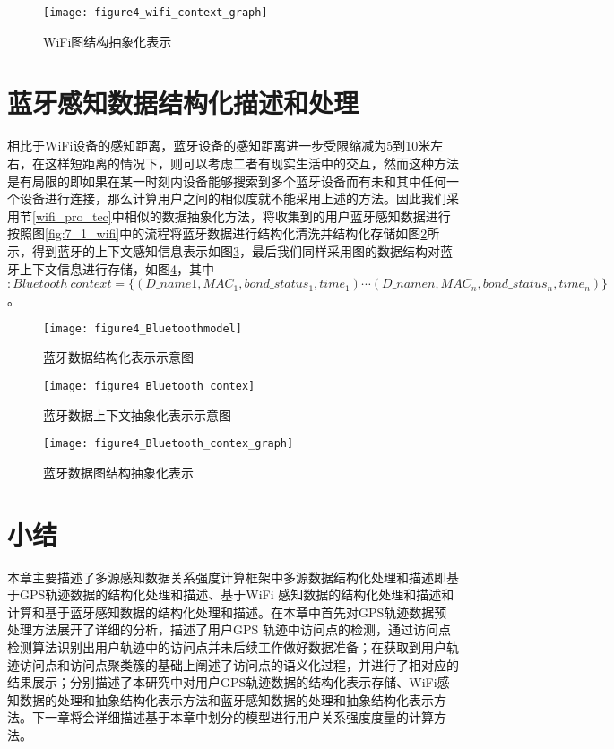 \begin{figure}[htp]
\centering
\texttt{[image: figure4\_wifi\_context\_graph]}
\caption{WiFi图结构抽象化表示}
\label{fig:wifi_context_graph}
\end{figure}
\section{蓝牙感知数据结构化描述和处理}
相比于WiFi设备的感知距离，蓝牙设备的感知距离进一步受限缩减为5到10米左右，在这样短距离的情况下，则可以考虑二者有现实生活中的交互，然而这种方法是有局限的即如果在某一时刻内设备能够搜索到多个蓝牙设备而有未和其中任何一个设备进行连接，那么计算用户之间的相似度就不能采用上述的方法。因此我们采用节\ref{wifi_pro_tec}中相似的数据抽象化方法，将收集到的用户蓝牙感知数据进行按照图\ref{fig:7_1_wifi}中的流程将蓝牙数据进行结构化清洗并结构化存储如图\ref{fig:Bluetoothmodel}所示，得到蓝牙的上下文感知信息表示如图\ref{fig:bluetooth_context}，最后我们同样采用图的数据结构对蓝牙上下文信息进行存储，如图\ref{fig:bluetooth_context_graph}，其中$:Bluetooth \ context= \{ (D\_name{1},MAC_{1},bond\_status_{1},time_{1}) \cdots  (D\_name{n},MAC_{n},bond\_status_{n},time_{n}) \}$。
\begin{figure}[htp]
\centering
\texttt{[image: figure4\_Bluetoothmodel]}
\caption{蓝牙数据结构化表示示意图}
\label{fig:Bluetoothmodel}
\end{figure}

\begin{figure}[htp]
\centering
\texttt{[image: figure4\_Bluetooth\_contex]}
\caption{蓝牙数据上下文抽象化表示示意图}
\label{fig:bluetooth_context}
\end{figure}

\begin{figure}[htb]
\centering
\texttt{[image: figure4\_Bluetooth\_contex\_graph]}
\caption{蓝牙数据图结构抽象化表示}
\label{fig:bluetooth_context_graph}
\end{figure}
\newpage
\section{小结}
\label{sec:section3-5}
本章主要描述了多源感知数据关系强度计算框架中多源数据结构化处理和描述即基于GPS轨迹数据的结构化处理和描述、基于WiFi 感知数据的结构化处理和描述和计算和基于蓝牙感知数据的结构化处理和描述。在本章中首先对GPS轨迹数据预处理方法展开了详细的分析，描述了用户GPS 轨迹中访问点的检测，通过访问点检测算法识别出用户轨迹中的访问点并未后续工作做好数据准备；在获取到用户轨迹访问点和访问点聚类簇的基础上阐述了访问点的语义化过程，并进行了相对应的结果展示；分别描述了本研究中对用户GPS轨迹数据的结构化表示存储、WiFi感知数据的处理和抽象结构化表示方法和蓝牙感知数据的处理和抽象结构化表示方法。下一章将会详细描述基于本章中划分的模型进行用户关系强度度量的计算方法。
